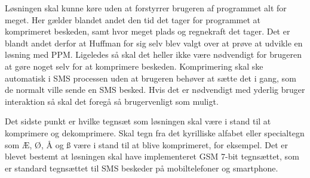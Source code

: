 Løsningen skal kunne køre uden at forstyrrer brugeren af programmet alt for meget. Her gælder blandet andet den tid det tager for programmet at komprimeret beskeden, samt hvor meget plads og regnekraft det tager. Det er blandt andet derfor at Huffman for sig selv blev valgt over at prøve at udvikle en løsning med PPM. Ligeledes så skal det heller ikke være nødvendigt for brugeren at gøre noget selv for at komprimere beskeden. Komprimering skal ske automatisk i SMS processen uden at brugeren behøver at sætte det i gang, som de normalt ville sende en SMS besked. Hvis det er nødvendigt med yderlig bruger interaktion så skal det foregå så brugervenligt som muligt.

Det sidste punkt er hvilke tegnsæt som løsningen skal være i stand til at komprimere og dekomprimere. Skal tegn fra det kyrilliske alfabet eller specialtegn som Æ, Ø, Å og ß være i stand til at blive komprimeret, for eksempel. Det er blevet bestemt at løsningen skal have implementeret GSM 7-bit tegnsættet, som er standard tegnsættet til SMS beskeder på mobiltelefoner og smartphone.